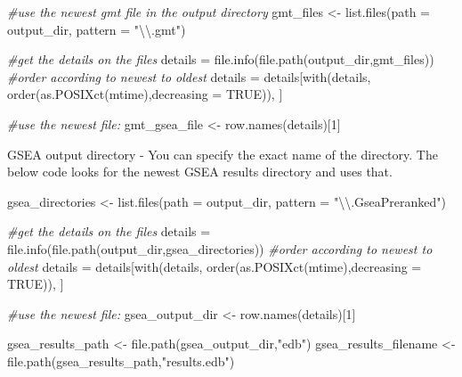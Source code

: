 \documentclass[
]{book}
\newenvironment{Shaded}{\begin{snugshade}}{\end{snugshade}}
\newcommand{\AttributeTok}[1]{\textcolor[rgb]{0.77,0.63,0.00}{#1}}
\newcommand{\CommentTok}[1]{\textcolor[rgb]{0.56,0.35,0.01}{\textit{#1}}}
\newcommand{\ConstantTok}[1]{\textcolor[rgb]{0.00,0.00,0.00}{#1}}
\newcommand{\DecValTok}[1]{\textcolor[rgb]{0.00,0.00,0.81}{#1}}
\newcommand{\FunctionTok}[1]{\textcolor[rgb]{0.00,0.00,0.00}{#1}}
\newcommand{\NormalTok}[1]{#1}
\newcommand{\OtherTok}[1]{\textcolor[rgb]{0.56,0.35,0.01}{#1}}
\newcommand{\SpecialCharTok}[1]{\textcolor[rgb]{0.00,0.00,0.00}{#1}}
\newcommand{\StringTok}[1]{\textcolor[rgb]{0.31,0.60,0.02}{#1}}
\begin{document}
\begin{Shaded}
\begin{Highlighting}[]
\CommentTok{\#use the newest gmt file in the output directory}
\NormalTok{gmt\_files }\OtherTok{\textless{}{-}} \FunctionTok{list.files}\NormalTok{(}\AttributeTok{path =}\NormalTok{ output\_dir, }\AttributeTok{pattern =} \StringTok{"}\SpecialCharTok{\textbackslash{}\textbackslash{}}\StringTok{.gmt"}\NormalTok{)}

  \CommentTok{\#get the details on the files}
\NormalTok{  details }\OtherTok{=} \FunctionTok{file.info}\NormalTok{(}\FunctionTok{file.path}\NormalTok{(output\_dir,gmt\_files))}
  \CommentTok{\#order according to newest to oldest}
\NormalTok{  details }\OtherTok{=}\NormalTok{ details[}\FunctionTok{with}\NormalTok{(details, }\FunctionTok{order}\NormalTok{(}\FunctionTok{as.POSIXct}\NormalTok{(mtime),}\AttributeTok{decreasing =} \ConstantTok{TRUE}\NormalTok{)), ]}

  \CommentTok{\#use the newest file:}
\NormalTok{ gmt\_gsea\_file }\OtherTok{\textless{}{-}} \FunctionTok{row.names}\NormalTok{(details)[}\DecValTok{1}\NormalTok{]}
\end{Highlighting}
\end{Shaded}

GSEA output directory - You can specify the exact name of the directory. The below code looks for the newest GSEA results directory and uses that.

\begin{Shaded}
\begin{Highlighting}[]
\NormalTok{gsea\_directories }\OtherTok{\textless{}{-}} \FunctionTok{list.files}\NormalTok{(}\AttributeTok{path =}\NormalTok{ output\_dir, }\AttributeTok{pattern =} \StringTok{"}\SpecialCharTok{\textbackslash{}\textbackslash{}}\StringTok{.GseaPreranked"}\NormalTok{)}

\CommentTok{\#get the details on the files}
\NormalTok{details }\OtherTok{=} \FunctionTok{file.info}\NormalTok{(}\FunctionTok{file.path}\NormalTok{(output\_dir,gsea\_directories))}
\CommentTok{\#order according to newest to oldest}
\NormalTok{details }\OtherTok{=}\NormalTok{ details[}\FunctionTok{with}\NormalTok{(details, }\FunctionTok{order}\NormalTok{(}\FunctionTok{as.POSIXct}\NormalTok{(mtime),}\AttributeTok{decreasing =} \ConstantTok{TRUE}\NormalTok{)), ]}

\CommentTok{\#use the newest file:}
\NormalTok{gsea\_output\_dir }\OtherTok{\textless{}{-}} \FunctionTok{row.names}\NormalTok{(details)[}\DecValTok{1}\NormalTok{]}

\NormalTok{gsea\_results\_path }\OtherTok{\textless{}{-}} \FunctionTok{file.path}\NormalTok{(gsea\_output\_dir,}\StringTok{"edb"}\NormalTok{)}
\NormalTok{gsea\_results\_filename }\OtherTok{\textless{}{-}} \FunctionTok{file.path}\NormalTok{(gsea\_results\_path,}\StringTok{"results.edb"}\NormalTok{)}
\end{Highlighting}
\end{Shaded}
\end{document}
